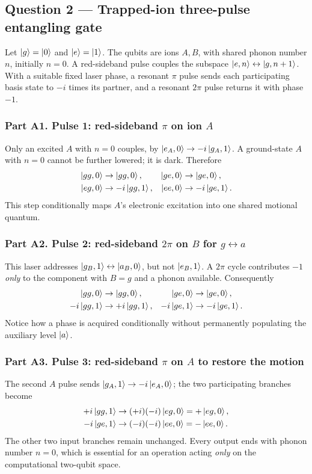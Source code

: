 \subsection{Question 2 --- Trapped-ion three-pulse entangling gate}
Let $\left\lvert g\right\rangle=\left\lvert 0\right\rangle$ and $\left\lvert e\right\rangle=\left\lvert 1\right\rangle$. The qubits are ions $A,B$, with shared phonon number $n$, initially $n=0$. A red-sideband pulse couples the subspace $\left\lvert e,n\right\rangle\leftrightarrow\left\lvert g,n+1\right\rangle$. With a suitable fixed laser phase, a resonant $\pi$ pulse sends each participating basis state to $-i$ times its partner, and a resonant $2\pi$ pulse returns it with phase $-1$.

\subsubsection*{Part A1. Pulse 1: red-sideband $\pi$ on ion $A$}
Only an excited $A$ with $n=0$ couples, by $\left\lvert e_A,0\right\rangle\to-i\left\lvert g_A,1\right\rangle$. A ground-state $A$ with $n=0$ cannot be further lowered; it is dark. Therefore
\begin{align*}
\left\lvert gg,0\right\rangle&\to\left\lvert gg,0\right\rangle,&\left\lvert ge,0\right\rangle&\to\left\lvert ge,0\right\rangle,\\
\left\lvert eg,0\right\rangle&\to-i\left\lvert gg,1\right\rangle,&\left\lvert ee,0\right\rangle&\to-i\left\lvert ge,1\right\rangle.
\end{align*}
This step conditionally maps $A$'s electronic excitation into one shared motional quantum.

\subsubsection*{Part A2. Pulse 2: red-sideband $2\pi$ on $B$ for $g\leftrightarrow a$}
This laser addresses $\left\lvert g_B,1\right\rangle\leftrightarrow\left\lvert a_B,0\right\rangle$, but not $\left\lvert e_B,1\right\rangle$. A $2\pi$ cycle contributes $-1$ \emph{only} to the component with $B=g$ and a phonon available. Consequently
\begin{align*}
\left\lvert gg,0\right\rangle&\to\left\lvert gg,0\right\rangle,&\left\lvert ge,0\right\rangle&\to\left\lvert ge,0\right\rangle,\\
-i\left\lvert gg,1\right\rangle&\to+i\left\lvert gg,1\right\rangle,&-i\left\lvert ge,1\right\rangle&\to-i\left\lvert ge,1\right\rangle.
\end{align*}
Notice how a phase is acquired conditionally without permanently populating the auxiliary level $\left\lvert a\right\rangle$.

\subsubsection*{Part A3. Pulse 3: red-sideband $\pi$ on $A$ to restore the motion}
The second $A$ pulse sends $\left\lvert g_A,1\right\rangle\to-i\left\lvert e_A,0\right\rangle$; the two participating branches become
\begin{align*}
+i\left\lvert gg,1\right\rangle&\to (+i)(-i)\left\lvert eg,0\right\rangle=+\left\lvert eg,0\right\rangle,\\
-i\left\lvert ge,1\right\rangle&\to (-i)(-i)\left\lvert ee,0\right\rangle=-\left\lvert ee,0\right\rangle.
\end{align*}
The other two input branches remain unchanged. Every output ends with phonon number $n=0$, which is essential for an operation acting \emph{only} on the computational two-qubit space.

